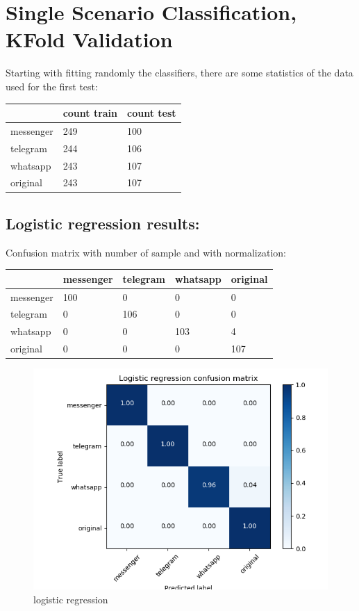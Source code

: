 \chapter{Single Scenario Classification, KFold Validation}

Starting with fitting randomly the classifiers, there are some statistics of the data used for the first test: \\
 {\def\arraystretch{1.3} 
 \begin{table}[H] 
\centering 
\begin{tabular}{|l|l|l|} 
\hline 
  &count train  &count test  \\ \hline
messenger  &249  &100  \\ \hline
telegram  &244  &106  \\ \hline
whatsapp  &243  &107  \\ \hline
original  &243  &107  \\ \hline
\end{tabular} 
\end{table} }
\section{Logistic regression results:} 
Confusion matrix with number of sample and with normalization:
 {\def\arraystretch{1.3} 
 \begin{table}[H] 
\centering 
\begin{tabular}{|l|l|l|l|l|} 
\hline 
  &messenger  &telegram  &whatsapp  &original  \\ \hline
messenger  &100  &0  &0  &0  \\ \hline
telegram  &0  &106  &0  &0  \\ \hline
whatsapp  &0  &0  &103  &4  \\ \hline
original  &0  &0  &0  &107  \\ \hline
\end{tabular} 
\end{table} }

 \begin{figure}[H] 
\centering 
\includegraphics[scale=.6]{images/lr_initial.png} 
\caption{logistic regression} 
\end{figure} 


